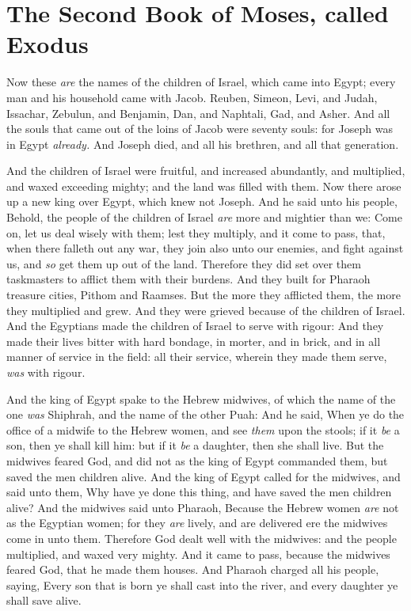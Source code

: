 \documentclass[11pt,letterpaper,oneside]{memoir}
\begin{document}
\chapter[Exodus]{The Second Book of Moses, called Exodus}
Now these \emph{are} the names of the children of Israel, which came
into Egypt; every man and his household came with Jacob. Reuben, Simeon,
Levi, and Judah, Issachar, Zebulun, and Benjamin, Dan, and Naphtali,
Gad, and Asher. And all the souls that came out of the loins of Jacob
were seventy souls: for Joseph was in Egypt \emph{already. }And Joseph
died, and all his brethren, and all that generation.

And the children of Israel were fruitful, and increased abundantly, and
multiplied, and waxed exceeding mighty; and the land was filled with
them. Now there arose up a new king over Egypt, which knew not Joseph.
And he said unto his people, Behold, the people of the children of
Israel \emph{are} more and mightier than we: Come on, let us deal wisely
with them; lest they multiply, and it come to pass, that, when there
falleth out any war, they join also unto our enemies, and fight against
us, and \emph{so} get them up out of the land. Therefore they did set
over them taskmasters to afflict them with their burdens. And they built
for Pharaoh treasure cities, Pithom and Raamses. But the more they
afflicted them, the more they multiplied and grew. And they were grieved
because of the children of Israel. And the Egyptians made the children
of Israel to serve with rigour: And they made their lives bitter with
hard bondage, in morter, and in brick, and in all manner of service in
the field: all their service, wherein they made them serve, \emph{was}
with rigour.

And the king of Egypt spake to the Hebrew midwives, of which the name of
the one \emph{was} Shiphrah, and the name of the other Puah: And he
said, When ye do the office of a midwife to the Hebrew women, and see
\emph{them} upon the stools; if it \emph{be} a son, then ye shall kill
him: but if it \emph{be} a daughter, then she shall live. But the
midwives feared God, and did not as the king of Egypt commanded them,
but saved the men children alive. And the king of Egypt called for the
midwives, and said unto them, Why have ye done this thing, and have
saved the men children alive? And the midwives said unto Pharaoh,
Because the Hebrew women \emph{are} not as the Egyptian women; for they
\emph{are} lively, and are delivered ere the midwives come in unto them.
Therefore God dealt well with the midwives: and the people multiplied,
and waxed very mighty. And it came to pass, because the midwives feared
God, that he made them houses. And Pharaoh charged all his people,
saying, Every son that is born ye shall cast into the river, and every
daughter ye shall save alive.
\end{document}
